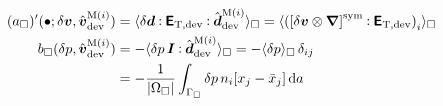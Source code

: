 \documentclass[10pt,a4paper]{article}
\begin{document}
\begin{align}
    (a_\Box)'(\bullet; \delta\boldsymbol{v},\hat{\boldsymbol{v}}^{\mathrm{M}(i)}_{\mathrm{dev}})
    & = 
    \langle \delta \boldsymbol{d} \mathbin{\vcentcolon} \boldsymbol{\mathsf{E}}_{\mathrm{T},\mathrm{dev}} \mathbin{\vcentcolon} \hat{\boldsymbol{d}}^{\mathrm{M}(i)}_{\mathrm{dev}} \rangle_\Box
    =
    \langle \left(\left[\delta\boldsymbol{v}\mathbin{\otimes}\boldsymbol{\nabla}\right]^{\mathrm{sym}} \mathbin{\vcentcolon} \boldsymbol{\mathsf{E}}_{\mathrm{T},\mathrm{dev}}\right)_{i} \rangle_\Box
\label{eq263a}
\\
    b_\Box(\delta p,\hat{\boldsymbol{v}}^{\mathrm{M}(i)}_{\mathrm{dev}})
    & = 
    - \langle \delta p\,\boldsymbol{I}\mathbin{\vcentcolon}\hat{\boldsymbol{d}}^{\mathrm{M}(i)}_{\mathrm{dev}} \rangle_\Box =
    - \langle \delta p \rangle_\Box\, \delta_{ij}
\nonumber
\\
    & = 
    - \frac{1}{|\Omega_\Box|}\int_{\Gamma_\Box} \delta p\, n_i [x_j-\bar{x}_j] \operatorname{d \!} a
\label{eq263b}
\end{align}
%
\end{document}
